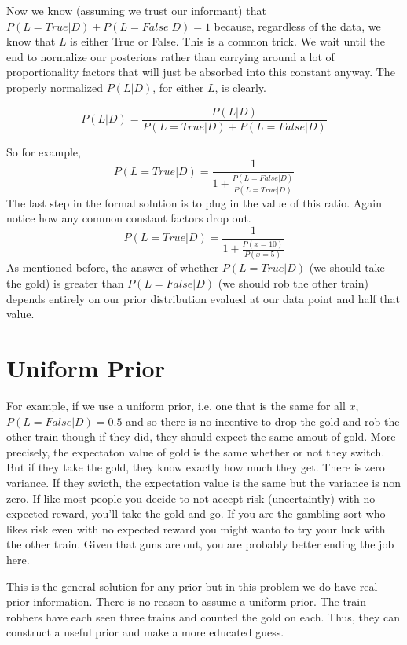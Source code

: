 \documentclass[12pt]{article}
\begin{document}
Now we know (assuming we trust our informant) that $P(L= True | D) + P(L= False | D) =1$ because, 
regardless of the data, we know that $L$ is either True or False. This is a common trick. We wait until the
end to normalize our posteriors rather than carrying around a lot of proportionality factors that will just be
absorbed into this constant anyway. The properly normalized $P(L | D)$, for either $L$, is clearly. 

\begin{equation}
P(L | D) = \frac{P(L | D)}{P(L=True | D) + P(L=False | D)}
\end{equation}

So for example, 
\begin{equation}
P(L=True | D) = \frac{1}{1+\frac{P(L=False | D)}{P(L=True|D)}}
\end{equation}
The last step in the formal solution is to plug in the value of this ratio. Again notice how any
common constant factors drop out. 
\begin{equation}
P(L=True | D) = \frac{1}{1+\frac{P(x=10)}{P(x=5)}}
\label{eq:final}
\end{equation}
As mentioned before, the answer of whether $P(L=True | D)$ (we should take the gold) is greater than
$P(L=False | D)$ (we should rob the other train) depends entirely on our prior distribution evalued at 
our data point and half that value. 

\section{Uniform Prior}

For example, if we use a uniform prior, i.e. one that is the same for all $x$, $P(L=False | D)=0.5$ and so 
there is no incentive to drop the gold and rob the other train though if they did, they should expect the 
same amout of gold. More precisely, the expectaton value of gold is the same whether or not they switch. But if
they take the gold, they know exactly how much they get. There is zero variance. If they swicth, the expectation
value is the same but the variance is non zero. If like most people you decide to not accept risk (uncertaintly) 
with no expected reward, you'll take the gold and go. If you are the gambling sort who likes risk even with no expected
reward you might wanto to try your luck with the other train. Given that guns are out, you are probably better ending
the job here. 

This is the general solution for any prior but in this problem we do have real prior information. There is no reason
to assume a uniform prior. The train robbers have each seen three trains and counted the gold on each. Thus, they can 
construct a useful prior and make a more educated guess. 
\end{document}
